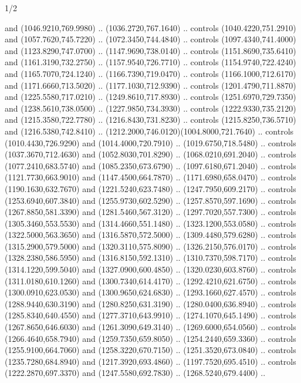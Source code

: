 \begin{flagdescription}{1/2}
\begin{scope}[xshift=\flagwidth/10+\flaglength/2,yshift=0.5778\flagwidth,scale=\flagwidth/512]
\begin{scope}[x=1.13,y=-1.13pt,xshift=-610.5,yshift=237,fill=gold]
\begin{scope}[cm={{0.5,0.0,0.0,0.5,(0.0,0.0)}}]
  and (1046.9210,769.9980) .. (1036.2720,767.1640) .. controls
  (1040.4220,751.2910) and (1057.7620,745.7220) .. (1072.3450,744.4840) ..
  controls (1097.4340,741.4000) and (1123.8290,747.0700) .. (1147.9690,738.0140)
  .. controls (1151.8690,735.6410) and (1161.3190,732.2750) ..
  (1157.9540,726.7710) .. controls (1154.9740,722.4240) and (1165.7070,724.1240)
  .. (1166.7390,719.0470) .. controls (1166.1000,712.6170) and
  (1171.6660,713.5020) .. (1177.1030,712.9390) .. controls (1201.4790,711.8870)
  and (1225.5580,717.0210) .. (1249.8610,717.8930) .. controls
  (1251.6970,729.7350) and (1238.5610,738.0500) .. (1227.9850,734.3930) ..
  controls (1222.9330,735.2120) and (1215.3580,722.7780) .. (1216.8430,731.8230)
  .. controls (1215.8250,736.5710) and (1216.5380,742.8410) ..
  (1212.2000,746.0120)(1004.8000,721.7640) .. controls (1010.4430,726.9290) and
  (1014.4000,720.7910) .. (1019.6750,718.5480) .. controls (1037.3670,712.4630)
  and (1052.8030,701.8290) .. (1068.0210,691.2040) .. controls
  (1077.2410,683.5740) and (1085.2350,673.6790) .. (1097.6180,671.2040) ..
  controls (1121.7730,663.9010) and (1147.4500,664.7870) .. (1171.6980,658.0470)
  .. controls (1190.1630,632.7670) and (1221.5240,623.7480) ..
  (1247.7950,609.2170) .. controls (1253.6940,607.3840) and (1255.9730,602.5290)
  .. (1257.8570,597.1690) .. controls (1267.8850,581.3390) and
  (1281.5460,567.3120) .. (1297.7020,557.7300) .. controls (1305.3460,553.5530)
  and (1314.4660,551.1480) .. (1323.1200,553.0580) .. controls
  (1322.5000,563.3650) and (1316.5870,572.5000) .. (1309.4480,579.6280) ..
  controls (1315.2900,579.5000) and (1320.3110,575.8090) .. (1326.2150,576.0170)
  .. controls (1328.2380,586.5950) and (1316.8150,592.1310) ..
  (1310.7370,598.7170) .. controls (1314.1220,599.5040) and (1327.0900,600.4850)
  .. (1320.0230,603.8760) .. controls (1311.0180,610.1260) and
  (1300.7340,614.4170) .. (1292.4210,621.6750) .. controls (1300.0910,623.0530)
  and (1300.9650,624.6830) .. (1293.1660,627.4570) .. controls
  (1288.9440,630.3190) and (1280.8250,631.3190) .. (1280.0400,636.8940) ..
  controls (1285.8340,640.4550) and (1277.3710,643.9910) .. (1274.1070,645.1490)
  .. controls (1267.8650,646.6030) and (1261.3090,649.3140) ..
  (1269.6000,654.0560) .. controls (1266.4640,658.7940) and (1259.7350,659.8050)
  .. (1254.2440,659.3360) .. controls (1255.9100,664.7060) and
  (1258.3220,670.7150) .. (1251.3520,673.0840) .. controls (1235.7280,684.8940)
  and (1217.3920,693.4860) .. (1197.7520,695.4510) .. controls
  (1222.2870,697.3370) and (1247.5580,692.7830) .. (1268.5240,679.4400) ..

\end{scope}
\end{scope}
\end{scope}
\end{flagdescription}
